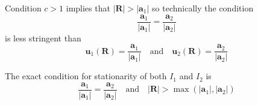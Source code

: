 Condition $c>1$ implies that $|\mathbf R|>|\mathbf a_1|$
so technically the condition
\begin{equation*}
\frac{\mathbf a_1}{|\mathbf a_1|}=\frac{\mathbf a_2}{|\mathbf a_2|}
\end{equation*}
is less stringent than
\begin{equation*}
\mathbf u_1(\mathbf R)=\frac{\mathbf a_1}{|\mathbf a_1|}
\quad\text{and}\quad
\mathbf u_2(\mathbf R)=\frac{\mathbf a_2}{|\mathbf a_2|}
\end{equation*}

The exact condition for stationarity of both $I_1$ and $I_2$ is
\begin{equation*}
\frac{\mathbf a_1}{|\mathbf a_1|}=\frac{\mathbf a_2}{|\mathbf a_2|}
\quad\text{and}\quad
|\mathbf R|>\max(|\mathbf a_1|,|\mathbf a_2|)
\end{equation*}


